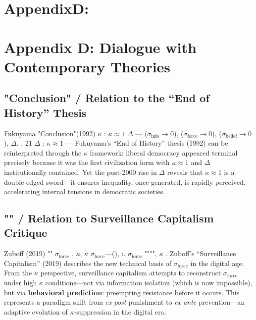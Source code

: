 \documentclass[11pt,a4paper]{article}
\theoremstyle{definition}
\newcommand{\coupling}{\kappa}
\newcommand{\suppress}{\sigma}
\begin{document}
\section{AppendixD:}
\section{Appendix D: Dialogue with Contemporary Theories}
\subsection{"Conclusion" / Relation to the ``End of History'' Thesis}
Fukuyama "Conclusion"(1992) $\coupling$ : 
$\coupling \approx 1$ $\Delta$ ---
($\suppress_{\text{info}} \to 0$), 
($\suppress_{\text{force}} \to 0$), 
($\suppress_{\text{belief}} \to 0$), 
 $\Delta$.
, 21 $\Delta$ : $\coupling \approx 1$ ---
Fukuyama's ``End of History'' thesis (1992) can be reinterpreted through the $\coupling$
framework: liberal democracy appeared terminal precisely because it was the first
civilization form with $\coupling \approx 1$ and $\Delta$ institutionally contained.
Yet the post-2000 rise in $\Delta$ reveals that $\coupling \approx 1$ is a double-edged
sword---it ensures inequality, once generated, is rapidly perceived, accelerating
internal tensions in democratic societies.
\subsection{"" / Relation to Surveillance Capitalism Critique}
Zuboff (2019) "" $\suppress_{\text{force}}$ 
. $\coupling$, $\coupling$ 
 $\suppress_{\text{force}}$---(), 
:.
 $\suppress_{\text{force}}$ """", 
 $\coupling$ .
Zuboff's ``Surveillance Capitalism'' (2019) describes the new technical basis of
$\suppress_{\text{force}}$ in the digital age. From the $\coupling$ perspective,
surveillance capitalism attempts to reconstruct $\suppress_{\text{force}}$ under
high $\coupling$ conditions---not via information isolation (which is now impossible),
but via \textbf{behavioral prediction}: preempting resistance before it occurs.
This represents a paradigm shift from \textit{ex post} punishment to
\textit{ex ante} prevention---an adaptive evolution of $\coupling$-suppression
in the digital era.
\end{document}
